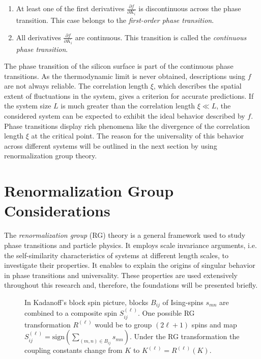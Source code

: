 	\begin{enumerate}
		\item At least one of the first derivatives $\frac{\partial f}{\partial K_i}$ is discontinuous across the phase transition. This case belongs to the \textit{first-order phase transition}.
		\item All derivatives $\frac{\partial f}{\partial K_i}$ are continuous. This transition is called the \textit{continuous phase transition}.
	\end{enumerate}
	The phase transition of the silicon surface is part of the continuous phase transitions. As the thermodynamic limit is never obtained, descriptions using $f$ are not always reliable. The correlation length $\xi$, which describes the spatial extent of fluctuations in the system, gives a criterion for accurate predictions. If the system size $L$ is much greater than the correlation length $\xi \ll L$, the considered system can be expected to exhibit the ideal behavior described by $f$. \\
	
	Phase transitions display rich phenomena like the divergence of the correlation length $\xi$ at the critical point. The reason for the universality of this behavior across different systems will be outlined in the next section by using renormalization group theory.
	\section{Renormalization Group Considerations} \label{Section::RG}
	The \textit{renormalization group} (RG) theory is a general framework used to study phase transitions and particle physics. It employs scale invariance arguments, i.e. the self-similarity characteristics of systems at different length scales, to investigate their properties. It enables to explain the origins of singular behavior in phase transitions and universality. These properties are used extensively throughout this research and, therefore, the foundations will be presented briefly.\\
	\begin{figure}
		\centering
		
		\caption{In Kadanoff's block spin picture,  blocks $B_{ij}$ of Ising-spins $s_{mn}$ are combined to a composite spin $S^{(\ell)}_{ij}$. One possible RG transformation $R^{(\ell)}$ would be to group $(2\ell + 1)$ spins and map $S^{(\ell)}_{ij} =	\text{sign}\left(\sum_{(m,n) \in B_{ij}} s_{mn} \right)$. Under the RG transformation the coupling constants change from $K$ to $K^{(\ell)} =	R^{(\ell)}(K)$.}
		\label{Fig::RG-Iteration}
	\end{figure}
	
